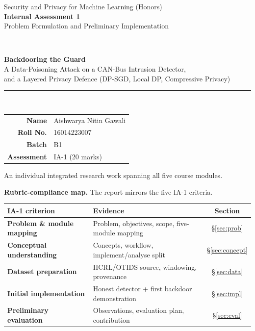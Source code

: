 \documentclass[11pt,a4paper]{article}
\begin{document}
\begin{titlepage}\centering
\vspace*{1.2cm}
{\large Security and Privacy for Machine Learning (Honors)}\\[0.3cm]
{\large\bfseries Internal Assessment 1}\\[0.2cm]
{\normalsize Problem Formulation and Preliminary Implementation}\\[1.6cm]
\rule{\textwidth}{0.4pt}\\[0.5cm]
{\LARGE\bfseries Backdooring the Guard}\\[0.4cm]
{\large A Data-Poisoning Attack on a CAN-Bus Intrusion Detector,\\
and a Layered Privacy Defence (DP-SGD, Local DP, Compressive Privacy)}\\[0.5cm]
\rule{\textwidth}{0.4pt}\\[2.2cm]
\begin{tabular}{rl}
\textbf{Name} & Aishwarya Nitin Gawali\\[4pt]
\textbf{Roll No.} & 16014223007\\[4pt]
\textbf{Batch} & B1\\[4pt]
\textbf{Assessment} & IA-1 (20 marks)\\
\end{tabular}
\vfill
{\small An individual integrated research work spanning all five course modules.}
\end{titlepage}

\tableofcontents\vspace{0.5cm}
\begin{shaded}\noindent\textbf{Rubric-compliance map.} The report mirrors the five IA-1 criteria.\end{shaded}
\begin{center}\small
\begin{tabularx}{\textwidth}{>{\bfseries}p{3.2cm}Yc}
\toprule IA-1 criterion & Evidence & Section\\ \midrule
Problem \& module mapping & Problem, objectives, scope, five-module mapping & \S\ref{sec:prob}\\
Conceptual understanding & Concepts, workflow, implement/analyse split & \S\ref{sec:concept}\\
Dataset preparation & HCRL/OTIDS source, windowing, provenance & \S\ref{sec:data}\\
Initial implementation & Honest detector + first backdoor demonstration & \S\ref{sec:impl}\\
Preliminary evaluation & Observations, evaluation plan, contribution & \S\ref{sec:eval}\\
\bottomrule\end{tabularx}\end{center}
\end{document}
